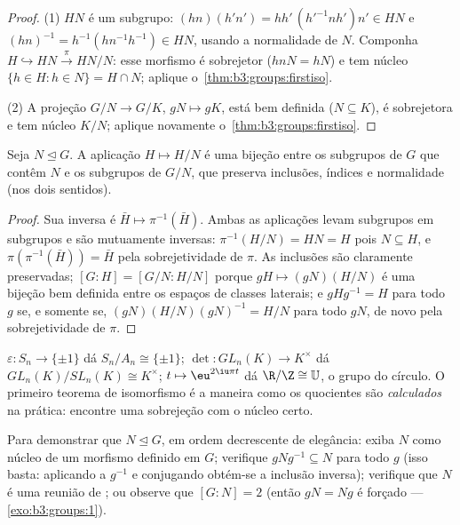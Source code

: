 \begin{proof}
(1) $HN$ é um subgrupo: $(hn)(h'n') = hh'\,(h'^{-1}nh')n' \in HN$ e $(hn)^{-1} = h^{-1}(hn^{-1}h^{-1}) \in HN$, usando a normalidade de $N$.
Componha $H \hookrightarrow HN \xrightarrow{\pi} HN/N$: esse morfismo é sobrejetor ($hnN = hN$) e tem núcleo $\{h \in H : h \in
N\} = H \cap N$;
aplique o~\cref{thm:b3:groups:firstiso}.

(2) A projeção $G/N \to G/K$, $gN \mapsto gK$, está bem definida ($N \subseteq K$), é sobrejetora e tem
núcleo $K/N$; aplique novamente o~\cref{thm:b3:groups:firstiso}.
\end{proof}

\begin{theorem}\label{thm:b3:groups:correspondence}
Seja $N \trianglelefteq G$. A aplicação $H \mapsto H/N$ é uma bijeção entre os subgrupos de $G$
que contêm $N$ e os subgrupos de $G/N$, que preserva inclusões,
índices e normalidade (nos dois sentidos).
\end{theorem}

\begin{proof}
Sua inversa é $\bar H \mapsto \pi^{-1}(\bar H)$. Ambas as aplicações levam subgrupos em subgrupos e
são mutuamente inversas: $\pi^{-1}(H/N) =
HN = H$ pois $N \subseteq H$, e $\pi(\pi^{-1}(\bar H)) = \bar H$ pela sobrejetividade de
$\pi$. As inclusões são claramente preservadas; $[G:H] = [G/N : H/N]$ porque $gH \mapsto (gN)(H/N)$ é
uma bijeção bem definida entre os espaços de classes laterais; e $gHg^{-1} = H$
para todo $g$ se, e somente se, $(gN)(H/N)(gN)^{-1} = H/N$ para todo $gN$, de novo
pela sobrejetividade de $\pi$.
\end{proof}

\begin{example}\label{ex:b3:groups:firstiso}
$\varepsilon \colon S_n \to \{\pm 1\}$ dá $S_n/A_n \cong
\{\pm1\}$; $\det \colon GL_n(K) \to K^\times$ dá $GL_n(K)/SL_n(K) \cong K^\times$; $t \mapsto \eu^{2\iu\pi t}$ dá $\R/\Z \cong \mathbb U$, o grupo do círculo. O
primeiro teorema de isomorfismo é a maneira como os quocientes são
\emph{calculados} na prática: encontre uma sobrejeção com o núcleo
certo.
\end{example}

\begin{method}\label{met:b3:groups:normal}
Para demonstrar que $N \trianglelefteq G$, em ordem decrescente de elegância: exiba
$N$ como núcleo de um morfismo definido em $G$; verifique $gNg^{-1} \subseteq N$
para todo $g$ (isso basta: aplicando a $g^{-1}$ e conjugando
obtém-se a inclusão inversa); verifique que $N$ é uma reunião de
; ou observe que $[G:N] = 2$ (então $gN = Ng$ é forçado ---
\cref{exo:b3:groups:1}).
\end{method}

